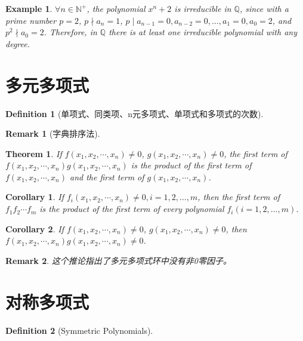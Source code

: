 \documentclass[onecolumn]{ctexart}
\newtheorem{definition}{Definition}
\newtheorem{theorem}{Theorem}
\newtheorem{corollary}{Corollary}
\newtheorem{remark}{Remark}
\newtheorem{example}{Example}
\begin{document}
\begin{example}
  $\forall n \in \mathbb{N}^+$, the polynomial $x^n + 2$ is irreducible in 
  $\mathbb{Q}$, since with a prime number $p = 2$, $p \nmid a_n = 1$, $p \mid 
  a_{n-1} = 0, a_{n-2} = 0, \ldots, a_1 = 0, a_0 = 2$, and $p^2 \nmid a_0 = 2$. 
  Therefore, in $\mathbb{Q}$ there is at least one irreducible polynomial with 
  any degree.
\end{example}

\section{多元多项式}

\begin{definition}[单项式、同类项、n元多项式、单项式和多项式的次数]
  
\end{definition}
\begin{remark}[字典排序法]
  
\end{remark}

\begin{theorem}
  If $f(x_1, x_2, \cdots, x_n) \neq 0$, $g(x_1, x_2, \cdots, x_n) \neq 0$, the 
  first term of \\ $f(x_1, x_2, \cdots, x_n)g(x_1, x_2, \cdots, x_n)$ is the 
  product of the first term of $f(x_1, x_2, \cdots, x_n)$ and the first term of 
  $g(x_1, x_2, \cdots, x_n)$.
\end{theorem}

\begin{corollary}
  If $f_i(x_1, x_2, \cdots, x_n) \neq 0, i = 1, 2, \ldots, m$, then the first 
  term of $f_1f_2 \cdots f_m$ is the product of the first term of every 
  polynomial $f_i (i = 1, 2, \ldots, m)$.
\end{corollary}

\begin{corollary}
  If $f(x_1, x_2, \cdots, x_n) \neq 0$, $g(x_1, x_2, \cdots, x_n) \neq 0$, then $f(x_1, x_2, \cdots, x_n)g(x_1, x_2, \cdots, x_n) \neq 0$.
\end{corollary}
\begin{remark}
  这个推论指出了多元多项式环中没有非0零因子。
\end{remark}

\section{对称多项式}

\begin{definition}[Symmetric Polynomials]
  
\end{definition}
\end{document}

